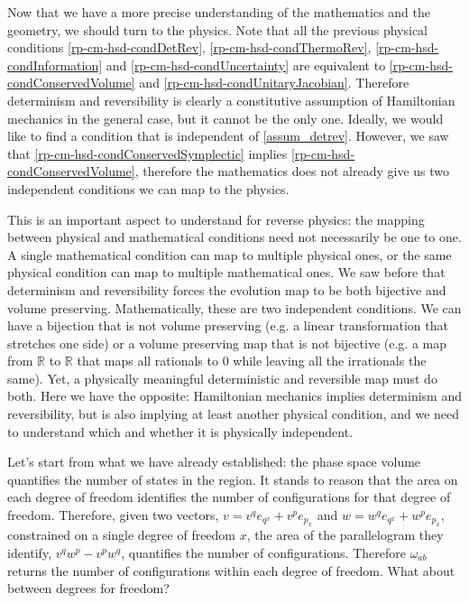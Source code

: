 Now that we have a more precise understanding of the mathematics and the geometry, we should turn to the physics. Note that all the previous physical conditions \ref{rp-cm-hsd-condDetRev}, \ref{rp-cm-hsd-condThermoRev}, \ref{rp-cm-hsd-condInformation} and \ref{rp-cm-hsd-condUncertainty} are equivalent to \ref{rp-cm-hsd-condConservedVolume} and \ref{rp-cm-hsd-condUnitaryJacobian}. Therefore determinism and reversibility is clearly a constitutive assumption of Hamiltonian mechanics in the general case, but it cannot be the only one. Ideally, we would like to find a condition that is independent of \ref{assum_detrev}. However, we saw that \ref{rp-cm-hsd-condConservedSymplectic} implies \ref{rp-cm-hsd-condConservedVolume}, therefore the mathematics does not already give us two independent conditions we can map to the physics.

This is an important aspect to understand for reverse physics: the mapping between physical and mathematical conditions need not necessarily be one to one. A single mathematical condition can map to multiple physical ones, or the same physical condition can map to multiple mathematical ones. We saw before that determinism and reversibility forces the evolution map to be both bijective and volume preserving. Mathematically, these are two independent conditions. We can have a bijection that is not volume preserving (e.g. a linear transformation that stretches one side) or a volume preserving map that is not bijective (e.g. a map from $\mathbb{R}$ to $\mathbb{R}$ that maps all rationals to $0$ while leaving all the irrationals the same). Yet, a physically meaningful deterministic and reversible map must do both. Here we have the opposite: Hamiltonian mechanics implies determinism and reversibility, but is also implying at least another physical condition, and we need to understand which and whether it is physically independent.

Let's start from what we have already established: the phase space volume quantifies the number of states in the region. It stands to reason that the area on each degree of freedom identifies the number of configurations for that degree of freedom. Therefore, given two vectors, $v = v^q e_{q^x} + v^p e_{p_x}$ and $w = w^q e_{q^x} + w^p e_{p_x}$, constrained on a single degree of freedom $x$, the area of the parallelogram they identify, $v^q w^p - v^p w^q$, quantifies the number of configurations. Therefore $\omega_{ab}$ returns the number of configurations within each degree of freedom. What about between degrees for freedom?

